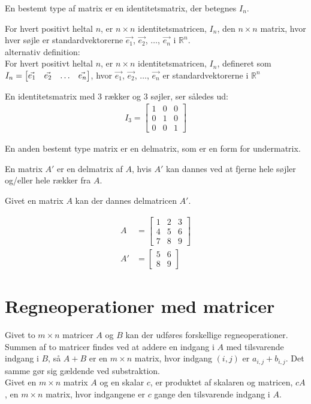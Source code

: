 En bestemt type af matrix er en identitetsmatrix, der betegnes $I_n$. 

\begin{defn} [Identitetsmatrix]
For hvert positivt heltal $n$, er $n \times n$ identitetsmatricen, $I_n$, den $n \times n$ matrix, hvor hver søjle er standardvektorerne $\vec{e_1}$, $\vec{e_2}$, $\dots$, $\vec{e_n}$ i $\mathds{R}^n$.\\

alternativ definition:\\
For hvert positivt heltal $n$, er $n \times n$ identitetsmatricen, $I_n$, defineret som\\ $I_n = \begin{bmatrix} \vec{e_1} & \vec{e_2} & \dots &  \vec{e_n} \end{bmatrix}$, hvor $\vec{e_1}$, $\vec{e_2}$, $\dots$, $\vec{e_n}$ er standardvektorerne i $\mathds{R}^n$
\label{def:imatrix}
\end{defn}

En identitetsmatrix med $3$ rækker og $3$ søjler, ser således ud:
\begin{align*}
I_3 = \begin{bmatrix}
	1 & 0 & 0 \\
	0 & 1 & 0 \\
	0 & 0 & 1 
\end{bmatrix}
\end{align*}

En anden bestemt type matrix er en delmatrix, som er en form for undermatrix. 
\begin{defn} [Delmatrix]
En matrix $A'$ er en delmatrix af $A$, hvis $A'$ kan dannes ved at fjerne hele søjler og/eller hele rækker fra $A$.
\label{delmatrix}
\end{defn}

Givet en matrix $A$ kan der dannes delmatricen $A'$.

\begin{align*}
A &= \begin{bmatrix}
	1 & 2 & 3 \\
	4 & 5 & 6 \\
	7 & 8 & 9 
\end{bmatrix}\\
A' &= \begin{bmatrix}
	5 & 6 \\
	8 & 9
\end{bmatrix}
\end{align*}



\section{Regneoperationer med matricer}
Givet to $m \times n$ matricer $A$ og $B$ kan der udføres forskellige regneoperationer. 
Summen af to matricer findes ved at addere en indgang i $A$ med tilsvarende indgang i $B$, så $A+B$ er en $m \times n$ matrix, hvor indgang $(i,j)$ er $a_{i,j}+b_{i,j}$. 
Det samme gør sig gældende ved substraktion. \\
Givet en $m \times n$ matrix $A$ og en skalar $c$, er produktet af skalaren og matricen, $cA$, en $m \times n$ matrix, hvor indgangene er $c$ gange den tilsvarende indgang i $A$. \\

